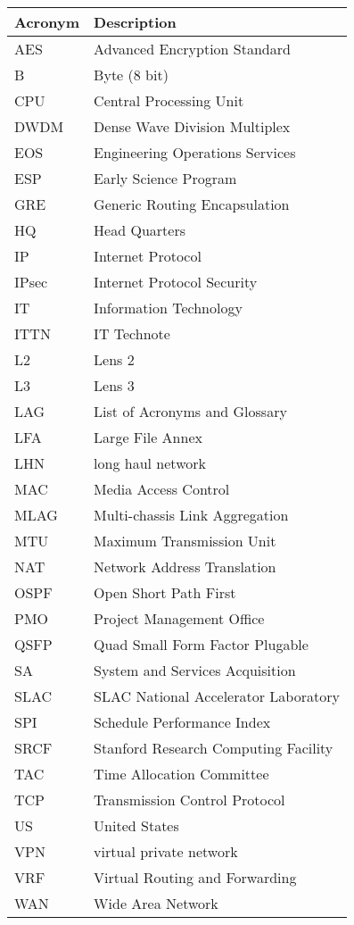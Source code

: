\addtocounter{table}{-1}
\begin{longtable}{p{}p{}}\hline
\textbf{Acronym} & \textbf{Description}  \\\hline

AES & Advanced Encryption Standard \\\hline
B & Byte (8 bit) \\\hline
CPU & Central Processing Unit \\\hline
DWDM & Dense Wave Division Multiplex \\\hline
EOS & Engineering Operations Services \\\hline
ESP & Early Science Program \\\hline
GRE & Generic Routing Encapsulation \\\hline
HQ & Head Quarters \\\hline
IP & Internet Protocol \\\hline
IPsec & Internet Protocol Security \\\hline
IT & Information Technology \\\hline
ITTN & IT Technote \\\hline
L2 & Lens 2 \\\hline
L3 & Lens 3 \\\hline
LAG & List of Acronyms and Glossary \\\hline
LFA & Large File Annex \\\hline
LHN & long haul network \\\hline
MAC & Media Access Control \\\hline
MLAG & Multi-chassis Link Aggregation \\\hline
MTU & Maximum Transmission Unit \\\hline
NAT & Network Address Translation \\\hline
OSPF & Open Short Path First \\\hline
PMO & Project Management Office \\\hline
QSFP & Quad Small Form Factor Plugable \\\hline
SA & System and Services Acquisition \\\hline
SLAC & SLAC National Accelerator Laboratory \\\hline
SPI & Schedule Performance Index \\\hline
SRCF & Stanford Research Computing Facility \\\hline
TAC & Time Allocation Committee \\\hline
TCP & Transmission Control Protocol \\\hline
US & United States \\\hline
VPN & virtual private network \\\hline
VRF & Virtual Routing and Forwarding \\\hline
WAN & Wide Area Network \\\hline
\end{longtable}

